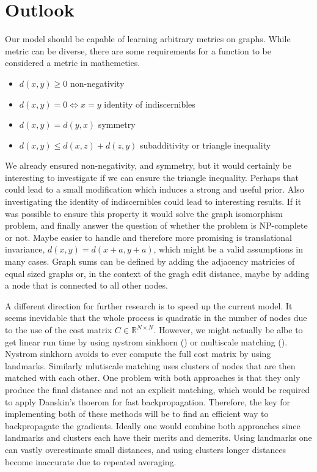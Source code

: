 \section{Outlook}

Our model should be capable of learning arbitrary metrics on graphs. While metric can be diverse, there are some requirements for a function to be considered a metric in mathemetics.
\begin{itemize}
    \itemsep0em
    \item $d(x,y) \ge 0$ non-negativity
    \item $d(x,y) = 0 \Leftrightarrow x = y$ identity of indiscernibles
    \item $d(x,y)  = d(y,x)$ symmetry
    \item $d(x,y) \le d(x,z) + d(z, y)$ subadditivity or triangle inequality
\end{itemize}
We already ensured non-negativity, and symmetry, but it would certainly be interesting to investigate if we can ensure the triangle inequality. Perhaps that could lead to a small modification which induces a strong and useful prior. Also investigating the identity of indiscernibles could lead to interesting results. If it was possible to ensure this property it would solve the graph isomorphism problem, and finally answer the question of whether the problem is NP-complete or not. Maybe easier to handle and therefore more promising is translational invariance, $d(x,y) = d(x+a,y+a)$, which might be a valid assumptions in many cases. Graph sums can be defined by adding the adjacency matricies of equal sized graphs \cite{graph_sum2004} or, in the context of the gragh edit distance, maybe by adding a node that is connected to all other nodes.

A different direction for further research is to speed up the current model. It seems inevidable that the whole process is quadratic in the number of nodes due to the use of the cost matrix $C \in \mathbb{R}^{N \times N}$. However, we might actually be albe to get linear run time by using nystrom sinkhorn (\citealp{?}) or multiscale matching (\citealp{?}). Nystrom sinkhorn avoids to ever compute the full cost matrix by using landmarks. Similarly mlutiscale matching uses clusters of nodes that are then matched with each other. One problem with both approaches is that they only produce the final distance and not an explicit matching, which would be required to apply Danskin's thoerom for fast backpropagation. Therefore, the key for implementing both of these methods will be to find an efficient way to backpropagate the gradients. Ideally one would combine both approaches since landmarks and clusters each have their merits and demerits. Using landmarks one can vastly overestimate small distances, and using clusters longer distances become inaccurate due to repeated averaging.
